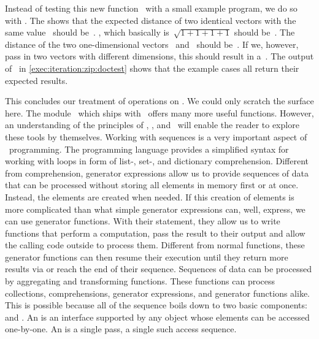 Instead of testing this new function~ with a small example program, we do so with .
The  shows that the expected distance of two identical vectors with the same value~\pythonil{[1, 1]} should be~.
, which basically is~$\sqrt{1 + 1 + 1 + 1}$ should be~.
The distance of the two one-dimensional vectors~\pythonil{[100]} and~\pythonil{[10]} should be~.
If we, however, pass in two vectors with different dimensions, this should result in a~.
The output of \pytest\ in \cref{exec:iteration:zip:doctest} shows that the example cases all return their expected results.

This concludes our treatment of operations on .
We could only scratch the surface here.
The module~ which ships with \python\ offers many more useful functions.
However, an understanding of the principles of , , and~ will enable the reader to explore these tools by themselves.%
\FloatBarrier%
\endhsection%
%
%
%
Working with sequences is a very important aspect of \python\ programming.
The programming language provides a simplified syntax for working with loops in form of list-, set-, and dictionary comprehension.
Different from comprehension, generator expressions allow us to provide sequences of data that can be processed without storing all elements in memory first or at once.
Instead, the elements are created when needed.
If this creation of elements is more complicated than what simple generator expressions can, well, express, we can use generator functions.
With their  statement, they allow us to write functions that perform a computation, pass the result to their output and allow the calling code outside to process them.
Different from normal functions, these generator functions can then resume their execution until they return more results via  or reach the end of their sequence.
Sequences of data can be processed by aggregating and transforming functions.
These functions can process collections, comprehensions, generator expressions, and generator functions alike.
This is possible because all of the sequence  boils down to two basic components:  and .
An  is an interface supported by any object whose elements can be accessed one-by-one.
An  is a single pass, a single such access sequence.%
\endhsection%
%
\endhsection%
%
